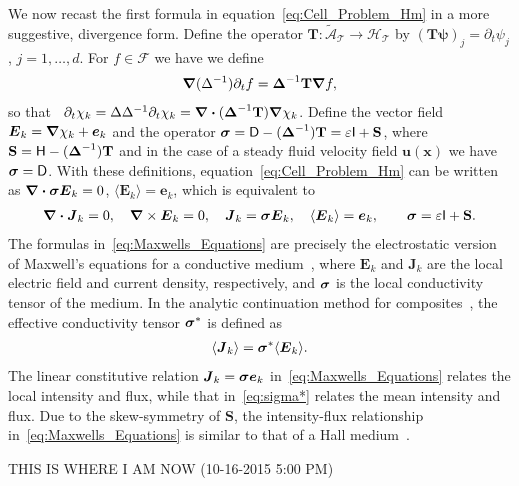 \documentclass[leqno,onefignum,onetabnum]{siamltex1213}
\newcommand{\Tb}{\mathbf{T}}
\newcommand{\Sb}{\mathbf{S}}
\newcommand{\Tc}{\mathcal{T}}
\newcommand{\Hc}{\mathcal{H}}
\newcommand{\Ac}{\mathcal{A}}
\newcommand{\Dm}{\mathsf{D}}
\newcommand{\Hm}{\mathsf{H}}
\newcommand{\Ib}{\mathsf{I}}
\newcommand{\Fs}{\mathscr{F}}
\newcommand\bsig{\mbox{\boldmath${\sigma}$}}
\newcommand\bDelta{\mbox{\boldmath${\Delta}$}}
\newcommand\bnabla{\mbox{\boldmath${\nabla}$}}
\providecommand\bcdot{\boldsymbol{\cdot}}
\newcommand{\vecJ}{\boldsymbol{J}}
\newcommand{\vecE}{\boldsymbol{E}}
\newcommand{\vecx}{\boldsymbol{x}}
\newcommand{\vecu}{\boldsymbol{u}}
\newcommand{\vece}{\boldsymbol{e}}
\newcommand{\vecpsi}{\boldsymbol{\psi}}
\begin{document}
We now recast the first formula in equation~\eqref{eq:Cell_Problem_Hm}
in a more suggestive, divergence form. Define the operator
$\Tb:\tilde{\Ac}_{\Tc}\to\Hc_{\Tc}$ by $(\Tb\vecpsi)_j=\partial_t\psi_j$,
$j=1,\ldots,d$. For $f\in\Fs$ we have we define   
%
\begin{align}\label{eq:Dt_T}
  \bnabla(\Delta^{-1})\partial_tf=\bDelta^{-1}\Tb\bnabla f ,
\end{align}
%
so that~\cite{Fannjiang:1994:SIAM_JAM:333}
$\partial_t\chi_k=\Delta\Delta^{-1}\partial_t\chi_k=\bnabla \bcdot(\bDelta^{-1}\Tb)\bnabla \chi_k$. Define the  
vector field $\vecE_k=\bnabla \chi_k+\vece_k$ and the operator
$\bsig=\Dm-(\bDelta^{-1})\Tb=\varepsilon\Ib+\Sb$, where
$\Sb=\Hm-(\bDelta^{-1})\Tb$ and in the case of a steady fluid velocity
field $\vecu(\vecx)$ we have $\bsig=\Dm$. With these definitions, 
equation~\eqref{eq:Cell_Problem_Hm} can
be written as  $\bnabla \bcdot\bsig\vecE_k=0$, $\langle\vecE_k\rangle=\vece_k$,
which is equivalent to    
%
\begin{align}\label{eq:Maxwells_Equations}    
  \bnabla \bcdot\vecJ_k=0, \quad
  \bnabla \times\vecE_k=0, \quad
  \vecJ_k=\bsig\vecE_k,\quad
  \langle\vecE_k\rangle=\vece _k,\qquad
  \bsig%
       =\varepsilon\Ib+\Sb.
\end{align}
%
The formulas in~\eqref{eq:Maxwells_Equations} are precisely the
electrostatic version of Maxwell's equations for a conductive
medium~\cite{Golden:CMP-473}, where $\vecE_k$ and $\vecJ_k$ are the
local 
electric field and current density, respectively, and $\bsig$ is the
local conductivity tensor of the medium. In the analytic continuation
method for composites~\cite{Golden:CMP-473}, 
the effective conductivity tensor $\bsig^*$ is defined as
% 
\begin{align}%
  \langle\vecJ_k\rangle=\bsig^*\langle\vecE_k\rangle.
\end{align}
%
The linear constitutive relation $\vecJ_k=\bsig\vece _k$
in~\eqref{eq:Maxwells_Equations} relates the local intensity and flux, 
while that in~\eqref{eq:sigma*} relates the mean intensity and
flux. Due to the skew-symmetry of $\Sb$, the intensity-flux
relationship in~\eqref{eq:Maxwells_Equations} is similar to that of a
Hall medium~\cite{Isichenko:JNS:1991:375,Fannjiang:1994:SIAM_JAM:333}.


\newpage


THIS IS WHERE I AM NOW (10-16-2015 5:00 PM)
\end{document}
